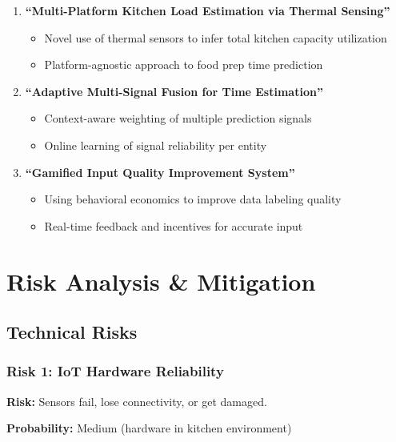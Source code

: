 \documentclass[11pt,a4paper]{article}
\begin{document}
\begin{enumerate}[leftmargin=*]
    \item \textbf{``Multi-Platform Kitchen Load Estimation via Thermal Sensing''}
    \begin{itemize}
        \item Novel use of thermal sensors to infer total kitchen capacity utilization
        \item Platform-agnostic approach to food prep time prediction
    \end{itemize}
    
    \item \textbf{``Adaptive Multi-Signal Fusion for Time Estimation''}
    \begin{itemize}
        \item Context-aware weighting of multiple prediction signals
        \item Online learning of signal reliability per entity
    \end{itemize}
    
    \item \textbf{``Gamified Input Quality Improvement System''}
    \begin{itemize}
        \item Using behavioral economics to improve data labeling quality
        \item Real-time feedback and incentives for accurate input
    \end{itemize}
\end{enumerate}

\newpage

\section{Risk Analysis \& Mitigation}

\subsection{Technical Risks}

\subsubsection{Risk 1: IoT Hardware Reliability}

\textbf{Risk:} Sensors fail, lose connectivity, or get damaged.

\textbf{Probability:} Medium (hardware in kitchen environment)
\end{document}

